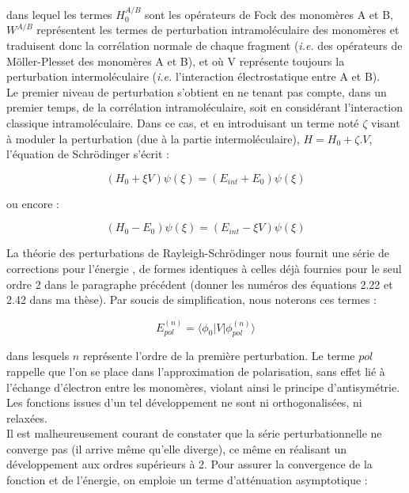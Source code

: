 \documentclass[12pt,a4paper]{book}
\begin{document}
	\noindent dans lequel les termes $H_{0}^{A/B}$ sont les opérateurs de Fock des monomères A et B, $W^{A/B}$ représentent les termes de perturbation intramoléculaire des monomères et traduisent donc la corrélation \og normale \fg{} de chaque fragment (\textit{i.e.} des opérateurs de Möller-Plesset des monomères A et B), et où V représente toujours la perturbation intermoléculaire (\textit{i.e.} l’interaction électrostatique entre A et B).\\
	
	Le premier niveau de perturbation s’obtient en ne tenant pas compte, dans un premier temps, de la corrélation intramoléculaire, soit en considérant l’interaction classique intramoléculaire. Dans ce cas, et en introduisant un terme noté $\zeta$ visant à moduler la perturbation (due à la partie intermoléculaire), $H = H_0 + \zeta.V$, l’équation de Schr\"{o}dinger s’écrit :
	
	\begin{equation}
	(H_{0} + \xi V) \psi (\xi) = (E_{int} + E_{0}) \psi (\xi)
	\end{equation}
	
	ou encore :
	
	\begin{equation}
	(H_{0} - E_{0}) \psi (\xi) = (E_{int} - \xi V) \psi (\xi)
	\end{equation}
	
	La théorie des perturbations de Rayleigh-Schr\"{o}dinger nous fournit une série de corrections pour l’énergie \cite{chipman1973perturbation}, de formes identiques à celles déjà fournies pour le seul ordre 2 dans le paragraphe précédent (donner les numéros des équations 2.22 et 2.42 dans ma thèse). Par soucis de simplification, nous noterons ces termes :
	
	\begin{equation}
	E_{pol}^{(n)} = \langle \phi_{0}|V| \phi_{pol}^{(n)} \rangle
	\end{equation}
	
	\noindent dans lesquels $n$ représente l’ordre de la première perturbation. Le terme \og $pol$ \fg{} rappelle que l'on se place dans l'approximation de polarisation, sans effet lié à l’échange d’électron entre les monomères, violant ainsi le principe d’antisymétrie. Les fonctions issues d’un tel développement ne sont ni orthogonalisées, ni relaxées.\\
	
	Il est malheureusement courant de constater que la série perturbationnelle ne converge pas (il arrive même qu'elle diverge), ce même en réalisant un développement aux ordres supérieurs à 2. Pour assurer la convergence de la fonction et de l’énergie, on emploie un terme d’atténuation asymptotique : 
	
\end{document}
